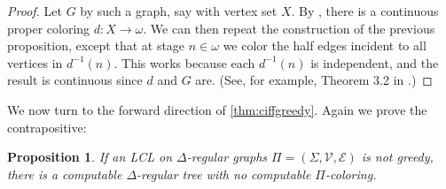 \documentclass[11pt]{amsart}
\newtheorem{prop}[theorem]{Proposition}
\theoremstyle{definition}
\newcommand{\V}{\mathcal{V}}
\newcommand{\inv}{^{-1}}
\begin{document}
\begin{proof}
    Let $G$ by such a graph, say with vertex set $X$. By \cite{bernshteyn_continuous}, there is a continuous proper coloring $d:X \rightarrow \omega$. We can then repeat the construction of the previous proposition, except that at stage $n \in \omega$ we color the half edges incident to all vertices in $d\inv(n)$. This works because each $d\inv(n)$ is independent, and the result is continuous since $d$ and $G$ are. (See, for example, Theorem 3.2 in \cite{BCG_Trees2}.)
\end{proof}

We now turn to the forward direction of \ref{thm:ciffgreedy}. Again we prove the contrapositive:

\begin{prop}
    If an LCL on $\Delta$-regular graphs $\Pi = (\Sigma,\V,\mathcal{E})$ is not greedy, there is a computable $\Delta$-regular tree with no computable $\Pi$-coloring.
\end{prop}
\end{document}
